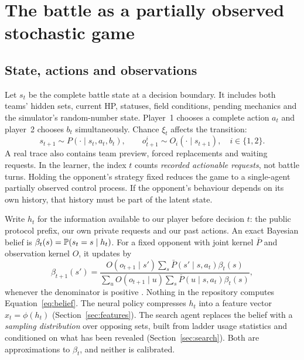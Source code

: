 \section{The battle as a partially observed stochastic game}
\label{sec:game}

\subsection{State, actions and observations}
Let $s_t$ be the complete battle state at a decision boundary. It includes
both teams' hidden sets, current HP, statuses, field conditions, pending
mechanics and the simulator's random-number state. Player~1 chooses a complete
action $a_t$ and player~2 chooses $b_t$ simultaneously. Chance $\xi_t$ affects
the transition:
\begin{equation}
  s_{t+1}\sim P(\cdot\mid s_t,a_t,b_t),\qquad
  o^i_{t+1}\sim O_i(\cdot\mid s_{t+1}),\quad i\in\{1,2\}.
  \label{eq:posg}
\end{equation}
A real trace also contains team preview, forced replacements and waiting
requests. In the learner, the index $t$ counts \emph{recorded actionable
requests}, not battle turns. Holding the opponent's strategy fixed reduces the
game to a single-agent partially observed control process. If the opponent's
behaviour depends on its own history, that history must be part of the latent
state.

Write $h_t$ for the information available to our player before decision $t$:
the public protocol prefix, our own private requests and our past actions. An
exact Bayesian belief is $\beta_t(s)=\mathbb{P}(s_t=s\mid h_t)$. For a fixed
opponent with joint kernel $\bar P$ and observation kernel $O$, it updates by
\begin{equation}
  \beta_{t+1}(s')
  =\frac{O(o_{t+1}\mid s')\sum_s\bar P(s'\mid s,a_t)\beta_t(s)}
  {\sum_u O(o_{t+1}\mid u)\sum_s\bar P(u\mid s,a_t)\beta_t(s)},
\label{eq:belief}
\end{equation}
whenever the denominator is positive \citep{kaelbling,smallwood1973}. Nothing
in the repository computes Equation~\eqref{eq:belief}. The neural policy
compresses $h_t$ into a feature vector $x_t=\phi(h_t)$
(Section~\ref{sec:features}). The search agent replaces the belief with a
\emph{sampling distribution} over opposing sets, built from ladder usage
statistics and conditioned on what has been revealed
(Section~\ref{sec:search}). Both are approximations to $\beta_t$, and neither
is calibrated.

